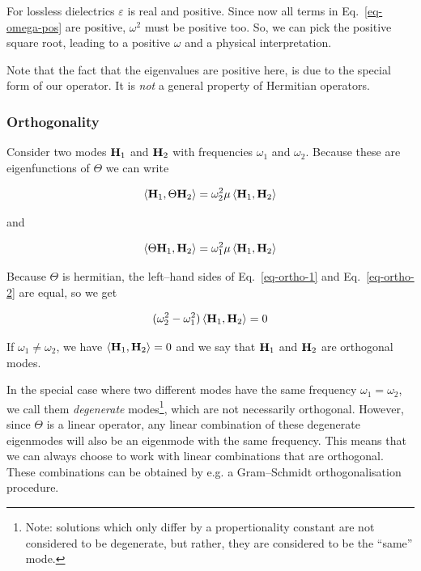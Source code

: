For lossless dielectrics $\varepsilon$ is real and positive. Since now all terms in Eq.~\ref{eq-omega-pos} are positive, $\omega^2$ must be positive too. So, we can pick the positive square root, leading to a positive $\omega$ and a physical interpretation.

Note that the fact that the eigenvalues are positive here, is due to the special form of our operator. It is \emph{not} a general property of Hermitian operators.

\subsubsection{Orthogonality}

Consider two modes ${\bf H}_1$ and ${\bf H}_2$ with frequencies $\omega_1$ and $\omega_2$. Because these are eigenfunctions of $\Theta$ we can write

\begin{equation}
 \left\langle {\bf H}_1 , \Theta {\bf H}_2\right\rangle = \omega_2^2 \mu \left\langle {\bf H}_1 , {\bf H}_2\right\rangle 
\label{eq-ortho-1}
\end{equation}

and

\begin{equation}
 \left\langle \Theta {\bf H}_1 , {\bf H}_2\right\rangle = \omega_1^2 \mu \left\langle {\bf H}_1 , {\bf H}_2\right\rangle
\label{eq-ortho-2}
\end{equation}

Because $\Theta$ is hermitian, the left--hand sides of Eq.~\ref{eq-ortho-1} and Eq.~\ref{eq-ortho-2} are equal, so we get

\begin{equation}
(\omega_2^2 - \omega_1^2) \left\langle {\bf H}_1 , {\bf H}_2\right\rangle = 0
\end{equation} 

If $\omega_1 \ne \omega_2$, we have $\left\langle {\bf H}_1 , {\bf H}_2\right\rangle = 0$ and we say that ${\bf H}_1$ and ${\bf H}_2$ are orthogonal modes.

In the special case where two different modes have the same frequency $\omega_1 = \omega_2$, we call them \emph{degenerate} modes\footnote{Note: solutions which only differ by a propertionality constant are not considered to be degenerate, but rather, they are considered to be the ``same'' mode.}, which are not necessarily orthogonal. However, since $\Theta$ is a linear operator, any linear combination of these degenerate eigenmodes will also be an eigenmode with the same frequency. This means that we can always choose to work with linear combinations that are orthogonal. These combinations can be obtained by e.g. a Gram--Schmidt orthogonalisation procedure.

